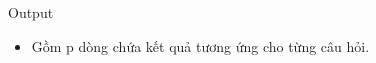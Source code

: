 Output  
\begin{itemize}
	\item     Gồm p dòng chứa kết quả tương ứng cho từng câu hỏi.   
\end{itemize}
